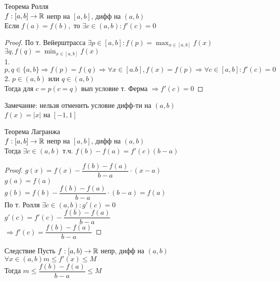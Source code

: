 \begin{theorem}
	Теорема Ролля \\
	$ f : [a, b] \rightarrow \mathbb{R} $ непр на $ [a, b] $, дифф на $ (a, b) $ \\
	Если $ f(a) = f(b),$ то $ \exists c \in (a, b) : f'(c) = 0 $ \\
	\begin{proof}
		По т. Вейерштрасса $ \exists p \in [a, b] : f(p) = \max_{x \in [a,b]} f(x) $ \\
		$ \exists q, f(q) = \min_{x \in [a,b]} f(x) $ \\
		1. $ p, q \in \{a, b\} \Rightarrow f(p) = f(q) \Rightarrow \forall x \in [a. b], f(x) = f(p) \Rightarrow \forall c \in [a, b] : f'(c) = 0$ \\
		2. $ p \in (a, b) $ или $ q \in (a, b) $ \\
		Тогда для $ c = p ( c = q ) $ вып условие т. Ферма $ \Rightarrow f'(c) = 0 $
	\end{proof}
	Замечание: нельзя отменить условие дифф-ти на $ (a,b) $ \\
	$ f(x) = |x| $ на $ [-1, 1] $
\end{theorem}

\begin{theorem}
	Теорема Лагранжа \\
	$ f : [a, b] \rightarrow \mathbb{R} $ непр на $ [a, b] $, дифф на $ (a, b) $ \\
	Тогда $ \exists c \in (a, b) $ т.ч. $ f(b) - f(a) = f'(c) (b - a) $ \\
	\begin{proof}
		$ g(x) = f(x) - \dfrac{f(b) - f(a)}{b -a } \cdot (x - a) $ \\
		$ g(a) = f(a) $ \\
		$ g(b) = f(b) -  \dfrac{f(b) - f(a)}{b -a } \cdot (b - a) = f(a) $\\
		По т. Ролля $ \exists c \in (a, b) : g'(c) = 0 $ \\
		$ g'(c) = f'(c) - \dfrac{f(b) - f(a)}{b -a } $\\
		$ \Rightarrow f'(c) = \dfrac{f(b) - f(a)}{b -a }  $ 
	\end{proof}
	Следствие Пусть $ f : [a, b) \rightarrow \mathbb{R} $ непр, дифф на $ (a, b) $ \\
	$ \forall x \in (a, b) m \leq f'(x) \leq M $\\
	Тогда $ m \leq \dfrac{f(b) - f(a)}{b -a} \leq M $
\end{theorem}

